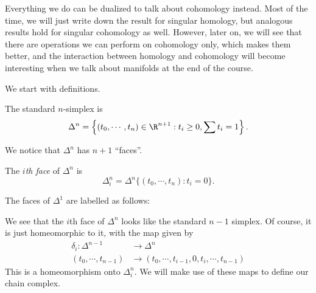 \documentclass[a4paper]{article}
\theoremstyle{definition}
\begin{document}
Everything we do can be dualized to talk about cohomology instead. Most of the time, we will just write down the result for singular homology, but analogous results hold for singular cohomology as well. However, later on, we will see that there are operations we can perform on cohomology only, which makes them better, and the interaction between homology and cohomology will become interesting when we talk about manifolds at the end of the course.

We start with definitions.
\begin{defi}
  The standard $n$-simplex is
  \[
    \Delta^n = \left\{(t_0, \cdots, t_n) \in \R^{n + 1} : t_i \geq 0, \sum t_i = 1\right\}.
  \]
\end{defi}
\begin{center}
\end{center}
We notice that $\Delta^n$ has $n + 1$ ``faces''.
\begin{defi}
  The \emph{$i$th face} of $\Delta^n$ is
  \[
    \Delta_i^n = \Delta^n \{(t_0, \cdots, t_n): t_i = 0\}.
  \]
\end{defi}
\begin{eg}
  The faces of $\Delta^1$ are labelled as follows:
  \begin{center}
  \end{center}
\end{eg}
We see that the $i$th face of $\Delta^n$ looks like the standard $n-1$ simplex. Of course, it is just homeomorphic to it, with the map given by
\begin{align*}
  \delta_i: \Delta^{n - 1} &\to \Delta^n\\
  (t_0, \cdots, t_{n - 1}) &\to (t_0, \cdots, t_{i - 1}, 0, t_i, \cdots, t_{n - 1})
\end{align*}
This is a homeomorphism onto $\Delta_i^n$. We will make use of these maps to define our chain complex.
\end{document}
